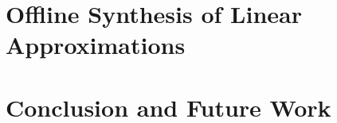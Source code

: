 \documentclass[11pt]{report}
\begin{document}
\chapter{Offline Synthesis of Linear Approximations}
\label{ch:offlinesyn}



%
%
%
%
%   
%   
%
%
%
%
%
%
%
%

\chapter{Conclusion and Future Work}
  \label{ch:conclusions}

\graphicspath{}


%
%
%
%
%
%
\clearpage
\end{document}

